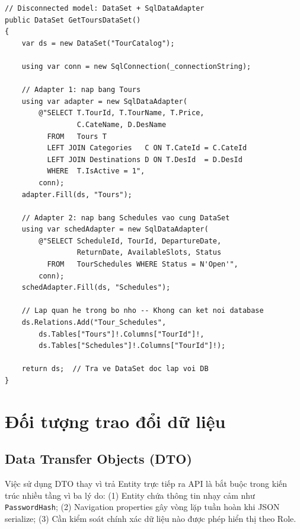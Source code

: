 \begin{lstlisting}[style=csharp,
  caption={ADO.NET Disconnected Model -- DataSet + DataRelation},
  label={lst:adodis}]
// Disconnected model: DataSet + SqlDataAdapter
public DataSet GetToursDataSet()
{
    var ds = new DataSet("TourCatalog");

    using var conn = new SqlConnection(_connectionString);

    // Adapter 1: nap bang Tours
    using var adapter = new SqlDataAdapter(
        @"SELECT T.TourId, T.TourName, T.Price,
                 C.CateName, D.DesName
          FROM   Tours T
          LEFT JOIN Categories   C ON T.CateId = C.CateId
          LEFT JOIN Destinations D ON T.DesId  = D.DesId
          WHERE  T.IsActive = 1",
        conn);
    adapter.Fill(ds, "Tours");

    // Adapter 2: nap bang Schedules vao cung DataSet
    using var schedAdapter = new SqlDataAdapter(
        @"SELECT ScheduleId, TourId, DepartureDate,
                 ReturnDate, AvailableSlots, Status
          FROM   TourSchedules WHERE Status = N'Open'",
        conn);
    schedAdapter.Fill(ds, "Schedules");

    // Lap quan he trong bo nho -- Khong can ket noi database
    ds.Relations.Add("Tour_Schedules",
        ds.Tables["Tours"]!.Columns["TourId"]!,
        ds.Tables["Schedules"]!.Columns["TourId"]!);

    return ds;  // Tra ve DataSet doc lap voi DB
}
\end{lstlisting}

\section{Đối tượng trao đổi dữ liệu}\label{Sec3.5}

\subsection{Data Transfer Objects (DTO)}\label{sub3.5.1}

Việc sử dụng DTO thay vì trả Entity trực tiếp ra API là bắt
buộc trong kiến trúc nhiều tầng vì ba lý do: (1) Entity chứa
thông tin nhạy cảm như \texttt{PasswordHash}; (2) Navigation
properties gây vòng lặp tuần hoàn khi JSON serialize; (3) Cần
kiểm soát chính xác dữ liệu nào được phép hiển thị theo Role.

